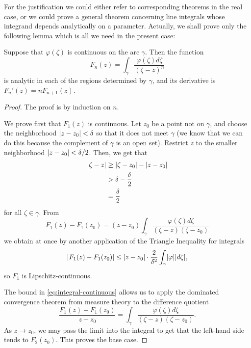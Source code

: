For the justification we could either refer to corresponding theorems in the real case, or we could prove a general theorem concerning line integrals whose integrand depends analytically on a parameter. Actually, we shall prove only the following lemma which is all we need in the present case:
\begin{lemma}
\label{lem:derivative-integral}
Suppose that $\varphi(\zeta)$ is continuous on the arc $\gamma$. Then the function $$F_n(z)=\int_{\gamma}\dfrac{\varphi(\zeta)d\zeta}{(\zeta-z)^n}$$ is analytic in each of the regions determined by $\gamma$, and its derivative is $F_n'(z)=nF_{n+1}(z)$.
\end{lemma}

\begin{proof}
The proof is by induction on $n$.

We prove first that $F_1(z)$ is continuous. Let $z_0$ be a point not on $\gamma$, and choose the neighborhood $\lvert z-z_0 \rvert<\delta$ so that it does not meet $\gamma$ (we know that we can do this because the complement of $\gamma$ is an open set). Restrict $z$ to the smaller neighborhood $\lvert z-z_0 \rvert<\delta/2$. Then, we get that \begin{align*}
\lvert \zeta-z \rvert &\ge \lvert \zeta-z_0 \rvert-\lvert z-z_0 \rvert \\
&>\delta-\dfrac{\delta}{2} \\
&=\dfrac{\delta}{2}
\end{align*}
for all $\zeta \in \gamma$. From $$F_1(z)-F_1(z_0)=(z-z_0)\int_{\gamma}\dfrac{\varphi(\zeta)d\zeta}{(\zeta-z)(\zeta-z_0)}$$ we obtain at once by another application of the Triangle Inequality for integrals
\begin{equation}
\label{eq:integral-continuous}
\lvert F_1(z)-F_1(z_0) \rvert\le \lvert z-z_0 \rvert \cdot \dfrac{2}{\delta^2}\int_{\gamma}\lvert \varphi \rvert \lvert d\zeta \rvert,
\end{equation} so $F_1$ is Lipschitz-continuous.

The bound in \ref{eq:integral-continuous} allows us to apply the dominated convergence theorem from measure theory to the difference quotient $$\dfrac{F_1(z)-F_1(z_0)}{z-z_0}=\int_{\gamma}\dfrac{\varphi(\zeta)d\zeta}{(\zeta-z)(\zeta-z_0)}.$$ As $z \rightarrow z_0$, we may pass the limit into the integral to get that the left-hand side tends to $F_2(z_0)$. This proves the base case.


\end{proof}
